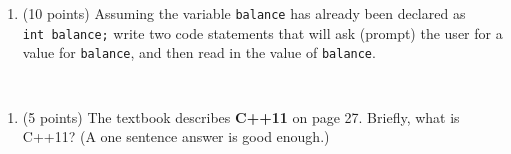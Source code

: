 \begin{enumerate}
\def\labelenumi{\arabic{enumi}.}
\setcounter{enumi}{4}
\tightlist
\item
  (10 points) Assuming the variable \texttt{balance} has already been
  declared as \texttt{int\ balance;} write two code statements that will
  ask (prompt) the user for a value for \texttt{balance}, and then read
  in the value of \texttt{balance}.
\end{enumerate}

\begin{verbatim}


\end{verbatim}

\begin{enumerate}
\def\labelenumi{\arabic{enumi}.}
\setcounter{enumi}{5}
\tightlist
\item
  (5 points) The textbook describes \textbf{C++11} on page 27. Briefly,
  what is C++11? (A one sentence answer is good enough.)
\end{enumerate}

\begin{verbatim}



\end{verbatim}

